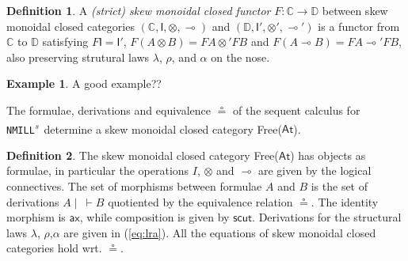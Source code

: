 \documentclass[submission,copyright,creativecommons]{eptcs}
\theoremstyle{definition}
\newtheorem{defn}{Definition}[section]
\newtheorem{example}{Example}[section]
\newcommand{\ax}{\mathsf{ax}}
\newcommand{\ot}{\otimes}
\newcommand{\lolli}{\multimap}
\newcommand{\I}{\mathsf{I}}
\newcommand{\NMILL}{\texttt{NMILL}}
\newcommand{\SkNMILL}{\NMILL\textsuperscript{\textit{s}}}
\newcommand{\FSkMCC}{\textsf{Free}}
\begin{document}
\begin{defn}
  A \emph{(strict) skew monoidal closed functor} $F : \mathbb{C} \rightarrow \mathbb{D}$ between skew monoidal closed categories $(\mathbb{C} , \I , \ot , \lolli)$ and $(\mathbb{D} , \I' , \ot' , \lolli')$ is a functor from $\mathbb{C}$ to $\mathbb{D}$ satisfying
    $F \I = \I'$, $F (A \ot B) = F A \ot' F B$ and
    $F(A \lolli B) = F A \lolli' F B$, also preserving  strutural laws $\lambda$, $\rho$, and $\alpha$ on the nose.
\end{defn}
\begin{example}
A good example??
\end{example}

The formulae, derivations and equivalence $\circeq$ of the sequent calculus for \SkNMILL\ determine a skew monoidal closed category \FSkMCC($\mathsf{At}$).
\begin{defn}\label{def:fskmcc}
  The skew monoidal closed category \FSkMCC($\mathsf{At}$) has
  objects as formulae, in particular the operations $I$, $\ot$ and $\lolli$ are given by the logical connectives. The set of morphisms between formulae $A$ and $B$ is the set of derivations $A \mid ~ \vdash B$ quotiented by the equivalence relation $\circeq$. The identity morphism is $\ax$, while composition is given by $\mathsf{scut}$. Derivations for the structural laws $\lambda$, $\rho$,$\alpha$ are given in (\ref{eq:lra}). All the equations of skew monoidal closed categories hold wrt. $\circeq$.
\end{defn}
\end{document}
